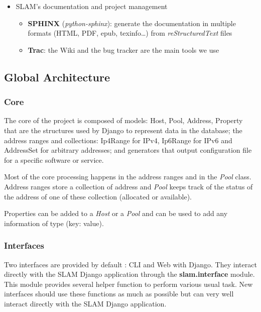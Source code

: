 \documentclass[12pt,a4paper,twoside]{report}
\begin{document}
\begin{itemize}
\begin{itemize}
\end{itemize}

\item {} 
SLAM's documentation and project management
\begin{itemize}
\item {} 
\textbf{SPHINX} (\emph{python-sphinx}): generate the documentation in multiple
formats (HTML, PDF, epub, texinfo…) from \emph{reStructuredText} files

\item {} 
\textbf{Trac}: the Wiki and the bug tracker are the main tools we use

\end{itemize}

\end{itemize}


\subsection*{Global Architecture}
\label{internal_general:global-architecture}

\subsubsection{Core}
\label{internal_general:core}
The core of the project is composed of models: Host, Pool, Address, Property
that are the structures used by Django to represent data in the database; the
address ranges and collections: Ip4Range for IPv4, Ip6Range for IPv6 and
AddressSet for arbitrary addresses; and generators that output configuration
file for a specific software or service.

Most of the core processing happens in the address ranges and in the \emph{Pool}
class. Address ranges store a collection of address and \emph{Pool} keeps track of
the status of the address of one of these collection (allocated or available).

Properties can be added to a \emph{Host} or a \emph{Pool} and can be used to add any
information of type (key: value).


\subsubsection{Interfaces}
\label{internal_general:interfaces}
Two interfaces are provided by default : CLI and Web with Django. They interact
directly with the SLAM Django application through the \textbf{slam.interface}
module. This module provides several helper function to perform various usual
task. New interfaces should use these functions as much as possible but can
very well interact directly with the SLAM Django application.
\end{document}

